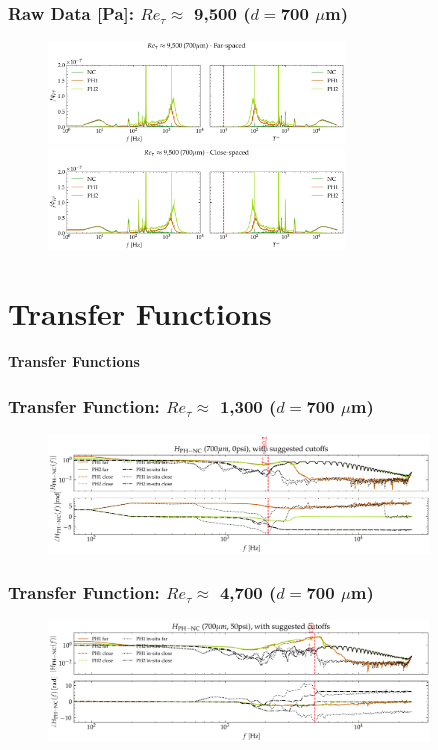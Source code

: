 \documentclass[aspectratio=169,9pt]{beamer}
\begin{document}
\begin{frame}
  \frametitle{Raw Data [Pa]: $Re_\tau \approx$ 9,500 ($d=$700 $\mu$m)}
  \begin{figure}
    \centering
    \includegraphics[width=0.7\textwidth]{tf_corrected_spectra/700_100psi_raw_spec_far.png}
    \includegraphics[width=0.7\textwidth]{tf_corrected_spectra/700_100psi_raw_spec_close.png}
  \end{figure}
\end{frame}


\section{Transfer Functions}
\begin{frame}
  \centering
  \vfill
  {\Huge\bfseries \textcolor{cardinalred}{Transfer Functions}}
  \vfill
\end{frame}

\begin{frame}
  \frametitle{Transfer Function: $Re_\tau\approx$ 1,300 ($d=$700 $\mu$m)}
  \begin{figure}
    \centering
    \includegraphics[width=0.9\textwidth]{tf_calib/700_0psi_H_2cal.png}
  \end{figure}
\end{frame}

\begin{frame}
  \frametitle{Transfer Function: $Re_\tau \approx$ 4,700 ($d=$700 $\mu$m)}
  \begin{figure}
    \centering
    \includegraphics[width=0.9\textwidth]{tf_calib/700_50psi_H_2cal.png}
  \end{figure}
\end{frame}
\end{document}
